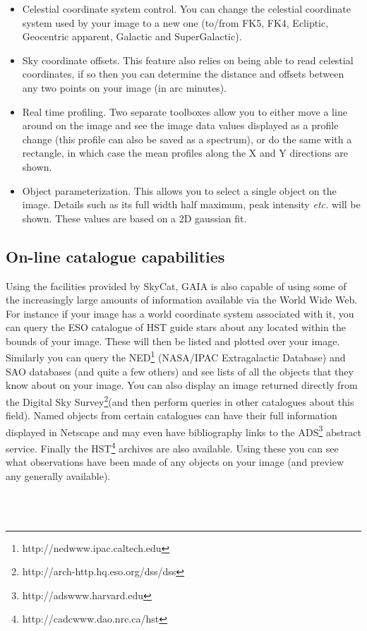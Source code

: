 \documentclass[twoside,11pt]{article}
\newcommand{\htmladdnormallinkfoot}[2]{#1\footnote{#2}}
\newcommand{\htmladdnormallink}[2]{#1}
\newcommand{\xlabel}[1]{}
\renewcommand{\_}{\texttt{\symbol{95}}}
\begin{document}
\begin{itemize}
\item Celestial coordinate system control. You can change the celestial
  coordinate system used by your image to a new one (to/from FK5,
  FK4, Ecliptic, Geocentric apparent, Galactic and SuperGalactic).

\item Sky coordinate offsets. This feature also relies on being
  able to read celestial coordinates, if so then you can
  determine the distance and offsets between any two points on
  your image (in arc minutes).

\item Real time profiling. Two separate toolboxes allow you to either 
  move a line around on the image and see the image data values
  displayed as a profile change (this profile can also be saved as a
  spectrum), or do the same with a rectangle, in which case the mean
  profiles along the X and Y directions are shown. 

\item Object parameterization. This allows you to select a single
  object on the image. Details such as its full width half
  maximum, peak intensity {\em etc.} will be shown. These values are
  based on a 2D gaussian fit.
\end{itemize}

\subsection{\xlabel{online_catalogue_capabilities}On-line catalogue capabilities}
Using the facilities provided by
\htmladdnormallink{SkyCat}{http://archive.eso.org/skycat}, GAIA is
also capable of using some of the increasingly large amounts of
information available via the World Wide Web. For instance if your
image has a world coordinate system associated with it, you can query
the ESO catalogue of HST guide stars about any located within the
bounds of your image. These will then be listed and plotted over your
image.  Similarly you can query the
\htmladdnormallinkfoot{NED}{http://nedwww.ipac.caltech.edu}
(NASA/IPAC Extragalactic Database) and SAO databases (and quite a few
others) and see lists of all the objects that they know about on your
image. You can also display an image returned directly from the
\htmladdnormallinkfoot{Digital Sky Survey}
{http://arch-http.hq.eso.org/dss/dss}(and then perform queries in
other catalogues about this field). Named objects from certain
catalogues can have their full information displayed in
\htmladdnormallink{Netscape}{http://home.netscape.com} and may even
have bibliography links to the
\htmladdnormallinkfoot{ADS}{http://adswww.harvard.edu} abstract
service.  Finally the
\htmladdnormallinkfoot{HST}{http://cadcwww.dao.nrc.ca/hst} archives
are also available. Using these you can see what observations have
been made of any objects on your image (and preview any generally
available).
\begin{htmlonly}
\\
\\
\end{htmlonly}
\end{document}
